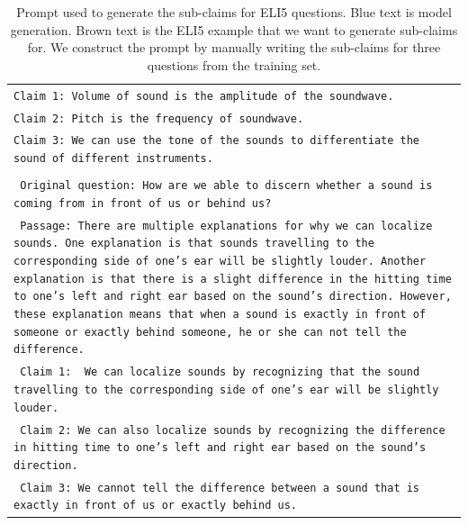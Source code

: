 \documentclass[11pt]{article}
\begin{document}
\begin{table}[ht]
\begin{tabular}{>{\raggedright\arraybackslash\tt}p{}<{}}
            Claim 1: Volume of sound is the amplitude of the soundwave.\\
            Claim 2: Pitch is the frequency of soundwave.\\
            Claim 3: We can use the tone of the sounds to differentiate the sound of different instruments. \\\\
            \vspace{-0.7em}
            {\color{brown}Original question: How are we able to discern whether a sound is coming from in front of us or behind us?} \\
            \vspace{-0.7em}
            {\color{brown}Passage: There are multiple explanations for why we can localize sounds. One explanation is that sounds travelling to the corresponding side of one's ear will be slightly louder. Another explanation is that there is a slight difference in the hitting time to one's left and right ear based on the sound's direction. However, these explanation means that when a sound is exactly in front of someone or exactly behind someone, he or she can not tell the difference.} \\
            \vspace{-0.7em}
            {\color{brown}Claim 1:} {\color{blue} We can localize sounds by recognizing that the sound travelling to the corresponding side of one's ear will be slightly louder.} \\
            \vspace{-0.7em}
            {\color{blue}Claim 2: We can also localize sounds by recognizing the difference in hitting time to one's left and right ear based on the sound's direction.}\\
            \vspace{-0.7em}
            {\color{blue}Claim 3: We cannot tell the difference between a sound that is exactly in front of us or exactly behind us.} \\
        \bottomrule
    \end{tabular}
    \caption{
        Prompt used to generate the sub-claims for ELI5 questions.
        {\color{blue} Blue text is model generation.}
        {\color{brown} Brown text is the ELI5 example that we want to generate sub-claims for.}
        We construct the prompt by manually writing the sub-claims for three questions from the training set. 
    }
    \label{tab:eli5-claims-prompt}
\end{table}
\end{document}
